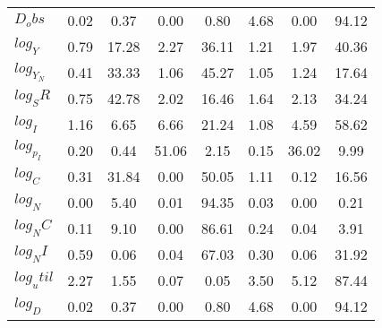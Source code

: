 \begin{center}
\begin{longtable}{lccccccc}
$D_obs     $	 & 	        0.02	 & 	        0.37	 & 	        0.00	 & 	        0.80	 & 	        4.68	 & 	        0.00	 & 	       94.12 \\ 
$log_Y     $	 & 	        0.79	 & 	       17.28	 & 	        2.27	 & 	       36.11	 & 	        1.21	 & 	        1.97	 & 	       40.36 \\ 
$log_Y_N   $	 & 	        0.41	 & 	       33.33	 & 	        1.06	 & 	       45.27	 & 	        1.05	 & 	        1.24	 & 	       17.64 \\ 
$log_SR    $	 & 	        0.75	 & 	       42.78	 & 	        2.02	 & 	       16.46	 & 	        1.64	 & 	        2.13	 & 	       34.24 \\ 
$log_I     $	 & 	        1.16	 & 	        6.65	 & 	        6.66	 & 	       21.24	 & 	        1.08	 & 	        4.59	 & 	       58.62 \\ 
$log_p_I   $	 & 	        0.20	 & 	        0.44	 & 	       51.06	 & 	        2.15	 & 	        0.15	 & 	       36.02	 & 	        9.99 \\ 
$log_C     $	 & 	        0.31	 & 	       31.84	 & 	        0.00	 & 	       50.05	 & 	        1.11	 & 	        0.12	 & 	       16.56 \\ 
$log_N     $	 & 	        0.00	 & 	        5.40	 & 	        0.01	 & 	       94.35	 & 	        0.03	 & 	        0.00	 & 	        0.21 \\ 
$log_NC    $	 & 	        0.11	 & 	        9.10	 & 	        0.00	 & 	       86.61	 & 	        0.24	 & 	        0.04	 & 	        3.91 \\ 
$log_NI    $	 & 	        0.59	 & 	        0.06	 & 	        0.04	 & 	       67.03	 & 	        0.30	 & 	        0.06	 & 	       31.92 \\ 
$log_util  $	 & 	        2.27	 & 	        1.55	 & 	        0.07	 & 	        0.05	 & 	        3.50	 & 	        5.12	 & 	       87.44 \\ 
$log_D     $	 & 	        0.02	 & 	        0.37	 & 	        0.00	 & 	        0.80	 & 	        4.68	 & 	        0.00	 & 	       94.12 \\ 
\end{longtable}
 \end{center}
